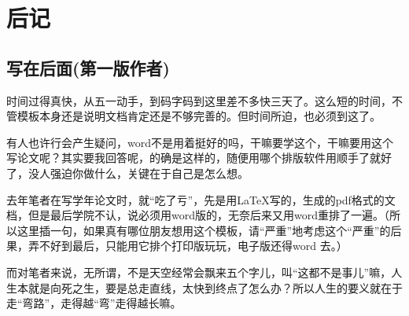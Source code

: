 \section{后记}

\subsection{写在后面(第一版作者)}

时间过得真快，从五一动手，到码字码到这里差不多快三天了。这么短的时间，不管模板本身还是说明文档肯定还是不够完善的。但时间所迫，也必须到这了。

有人也许行会产生疑问，word不是用着挺好的吗，干嘛要学这个，干嘛要用这个写论文呢？其实要我回答呢，的确是这样的，随便用哪个排版软件用顺手了就好了，没人强迫你做什么，关键在于自己是怎么想。

去年笔者在写学年论文时，就“吃了亏”，先是用\LaTeX 写的，生成的pdf格式的文档，但是最后学院不认，说必须用word版的，无奈后来又用word重排了一遍。（所以这里插一句，如果真有哪位朋友想用这个模板，请“严重”地考虑这个“严重”的后果，弄不好到最后，只能用它排个打印版玩玩，电子版还得word 去。）

而对笔者来说，无所谓，不是天空经常会飘来五个字儿，叫“这都不是事儿”嘛，人生本就是向死之生，要是总走直线，太快到终点了怎么办？所以人生的要义就在于走“弯路”，走得越“弯”走得越长嘛。




